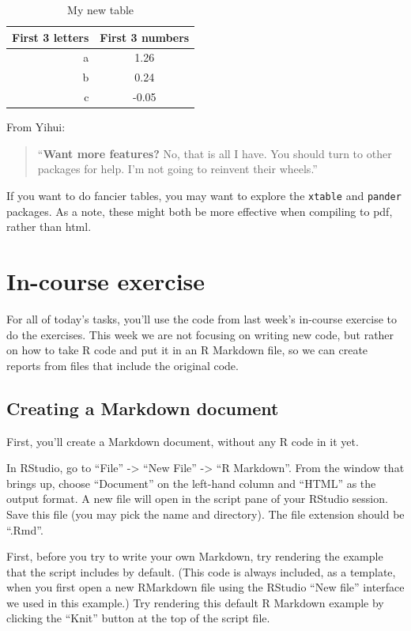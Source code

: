 \documentclass[]{book}
\theoremstyle{definition}
\theoremstyle{definition}
\theoremstyle{definition}
\theoremstyle{remark}
\begin{document}
\begin{table}

\caption{\label{tab:unnamed-chunk-297}My new table}
\centering
\begin{tabular}[t]{r|c}
\hline
First 3 letters & First 3 numbers\\
\hline
a & 1.26\\
\hline
b & 0.24\\
\hline
c & -0.05\\
\hline
\end{tabular}
\end{table}

From Yihui:

\begin{quote}
``\textbf{Want more features?} No, that is all I have. You should turn
to other packages for help. I'm not going to reinvent their wheels.''
\end{quote}

If you want to do fancier tables, you may want to explore the
\texttt{xtable} and \texttt{pander} packages. As a note, these might
both be more effective when compiling to pdf, rather than html.

\section{In-course exercise}\label{in-course-exercise-4}

For all of today's tasks, you'll use the code from last week's in-course
exercise to do the exercises. This week we are not focusing on writing
new code, but rather on how to take R code and put it in an R Markdown
file, so we can create reports from files that include the original
code.

\subsection{Creating a Markdown
document}\label{creating-a-markdown-document}

First, you'll create a Markdown document, without any R code in it yet.

In RStudio, go to ``File'' -\textgreater{} ``New File'' -\textgreater{}
``R Markdown''. From the window that brings up, choose ``Document'' on
the left-hand column and ``HTML'' as the output format. A new file will
open in the script pane of your RStudio session. Save this file (you may
pick the name and directory). The file extension should be ``.Rmd''.

First, before you try to write your own Markdown, try rendering the
example that the script includes by default. (This code is always
included, as a template, when you first open a new RMarkdown file using
the RStudio ``New file'' interface we used in this example.) Try
rendering this default R Markdown example by clicking the ``Knit''
button at the top of the script file.
\end{document}
